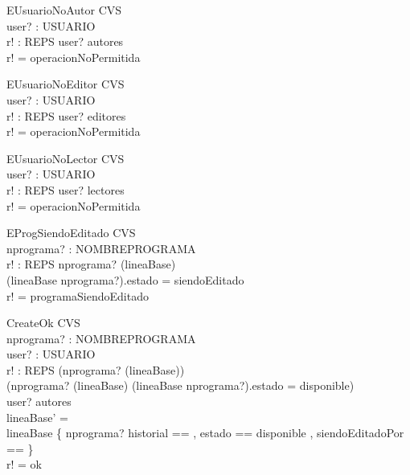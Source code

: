 \documentclass[11pt]{article}
\begin{document}
  \begin{schema}{EUsuarioNoAutor}
  \Xi CVS \\
  user? : USUARIO \\
  r! : REPS
  \where
  user? \notin autores \\
  r! = operacionNoPermitida
  \end{schema}
  
  \begin{schema}{EUsuarioNoEditor}
  \Xi CVS \\
  user? : USUARIO \\
  r! : REPS
  \where
  user? \notin editores \\
  r! = operacionNoPermitida
  \end{schema}
  
  \begin{schema}{EUsuarioNoLector}
  \Xi CVS \\
  user? : USUARIO \\
  r! : REPS
  \where
  user? \notin lectores \\
  r! = operacionNoPermitida
  \end{schema}
  
  \begin{schema}{EProgSiendoEditado}
  \Xi CVS \\
  nprograma? : NOMBREPROGRAMA \\
  r! : REPS
  \where
  nprograma? \in (\dom lineaBase) \\
  (lineaBase \; nprograma?).estado = siendoEditado \\
  r! = programaSiendoEditado
  \end{schema}
  
  \begin{schema}{CreateOk}
  \Delta CVS \\
  nprograma? : NOMBREPROGRAMA \\
  user? : USUARIO \\
  r! : REPS
  \where
  (nprograma? \notin (\dom lineaBase)) \lor \\
  \; \; (nprograma? \in (\dom lineaBase) \land (lineaBase \; nprograma?).estado = disponible) \\
  user? \in autores \\
  lineaBase' = \\
  \; \; lineaBase \oplus \{ nprograma? \mapsto \lblot historial == \emptyset , estado == disponible , siendoEditadoPor == \emptyset \rblot \} \\
  r! = ok
  \end{schema}
  
\end{document}
